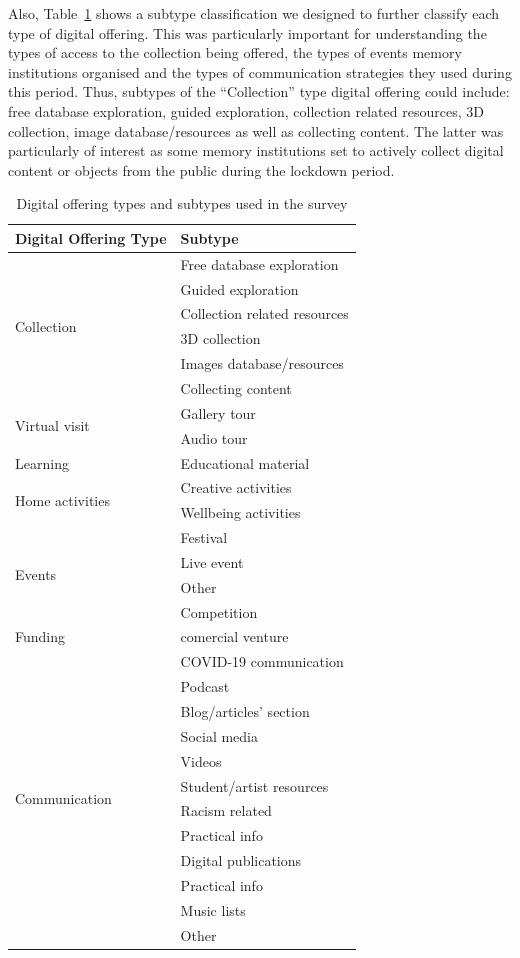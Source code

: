 \documentclass{egpubl}
\begin{document}
Also, Table~\ref{tab:digoffer} shows a subtype classification we designed to further classify each type of digital offering. This was particularly important for understanding the types of access to the collection being offered, the types of events memory institutions organised and the types of communication strategies they used during this period. Thus, subtypes of the ``Collection'' type digital offering could include: free database exploration, guided exploration, collection related resources, 3D collection, image database/resources as well as collecting content. The latter was particularly of interest as some memory institutions set to actively collect digital content or objects from the public during the lockdown period.

\begin{table}
\begin{tabular}
{ | l | l | }
    \hline
    Digital Offering Type  & Subtype  \\
    \hline
  \multirow{6}{*}{Collection} & Free database exploration  \\
&  Guided exploration  \\
&  Collection related resources \\
&  3D collection \\
&  Images database/resources \\
&  Collecting content \\
    \hline
 \multirow{2}{*}{Virtual visit} & Gallery tour  \\
&  Audio tour  \\
    \hline
 Learning & Educational material  \\
    \hline
 \multirow{2}{*}{Home activities} & Creative activities \\
&  Wellbeing activities  \\
    \hline
 \multirow{4}{*}{Events} & Festival\\
&  Live event \\
&  Other \\
&  Competition \\
    \hline
 Funding & comercial venture \\
    \hline
 \multirow{12}{*}{Communication} & COVID-19 communication \\
& Podcast \\
& Blog/articles' section \\
& Social media  \\
& Videos \\
& Student/artist resources \\
& Racism related \\
& Practical info \\
& Digital publications \\
& Practical info \\
& Music lists \\
& Other \\
    \hline
\end{tabular}
\caption{\label{tab:digoffer}Digital offering types and subtypes used in the survey}
\end{table}
\end{document}
